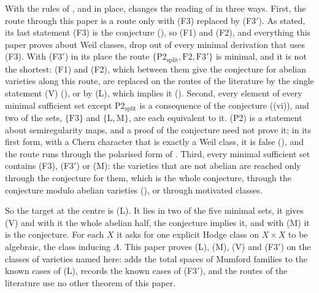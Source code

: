 \begin{remark}\label{rem:bullseye}
With the rules of ,  and
 in place,  changes the reading of
 in three ways. First, the route through this paper is
a route only with (F3) replaced by \textup{(F3$'$)}. As stated, its last
statement (F3) is the conjecture (), so (F1) and (F2), and
everything this paper proves about Weil classes, drop out of every minimal
derivation that uses (F3). With \textup{(F3$'$)} in its place the route
$\{\mathrm{P2}_{\mathrm{split}},\mathrm{F2},\mathrm{F3}'\}$ is minimal, and it is not the
shortest: (F1) and (F2), which between them give the conjecture for abelian
varieties along this route, are replaced on the routes of the literature by
the single statement \textup{(V)} (), or by \textup{(L)},
which implies it (). Second, every element of every minimal sufficient set
except $\mathrm{P2}_{\mathrm{split}}$ is a consequence of the conjecture
((vi)), and
two of the sets, $\{\mathrm{F3}\}$ and $\{\mathrm{L},\mathrm{M}\}$, are
each equivalent to it. (P2) is a statement about semiregularity maps, and a
proof of the conjecture need not prove it; in its first form, with a Chern
character that is exactly a Weil class, it is false (\cite[Theorem~3.5]{paperII}), and
the route runs through the polarised form of \cite[Remark~3.6]{paperII}. Third, every minimal sufficient set
contains (F3), \textup{(F3$'$)} or \textup{(M)}: the varieties that are not
abelian are reached only through the conjecture for them, which is the whole
conjecture, through the conjecture modulo abelian varieties
(), or through motivated classes.

So the target at the centre is \textup{(L)}. It lies in two of the five
minimal sets, it gives \textup{(V)} and with it the whole abelian half, the
conjecture implies it, and with \textup{(M)} it is the conjecture. For each
$X$ it asks for one explicit Hodge class on $X\times X$ to be algebraic, the
class inducing $\Lambda$. This paper proves \textup{(L)}, \textup{(M)},
\textup{(V)} and \textup{(F3$'$)} on the classes of varieties named here:
 adds the total spaces of Mumford families to the
known cases of \textup{(L)},  records the known cases of
\textup{(F3$'$)}, and the routes of the literature use no other theorem of
this paper.
\end{remark}

